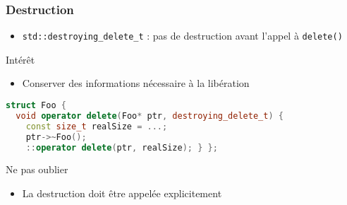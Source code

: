 \documentclass[C++.tex]{subfiles}
\begin{document}
\begin{frame}[fragile]
	\frametitle{Destruction}
	\begin{itemize}
		\item \lstinline|std::destroying_delete_t| : pas de destruction avant l'appel à \lstinline|delete()|
	\end{itemize}

	\begin{block}{Intérêt}
		\begin{itemize}
			\item Conserver des informations nécessaire à la libération
		\end{itemize}
	\end{block}

	\begin{lstlisting}[language=C++]
struct Foo {
  void operator delete(Foo* ptr, destroying_delete_t) {
    const size_t realSize = ...;
    ptr->~Foo();
    ::operator delete(ptr, realSize); } };\end{lstlisting}
		
	\begin{alertblock}{Ne pas oublier}
		\begin{itemize}
			\item La destruction doit être appelée explicitement
		\end{itemize}
	\end{alertblock}
\end{frame}
\end{document}
